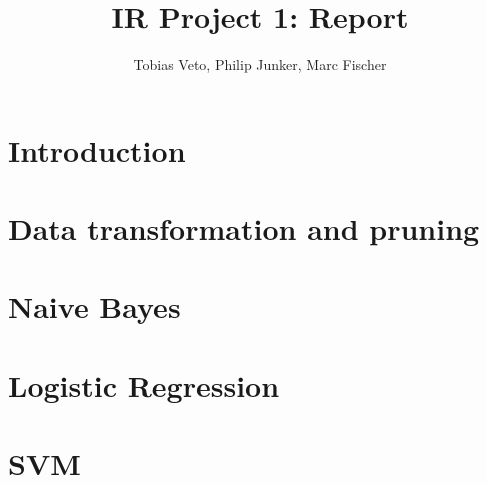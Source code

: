 \documentclass{article}
\title{IR Project 1: Report}
\author{Tobias Veto, Philip Junker, Marc Fischer}
\begin{document}
 
\section*{Introduction}
\lipsum[1] %

\section*{Data transformation and pruning}
\lipsum[2-3] %

\section*{Naive Bayes}
\lipsum[1-4] %

\section*{Logistic Regression}
\lipsum[1-4] %

\section*{SVM}
\lipsum[1-4] %
\end{document}

